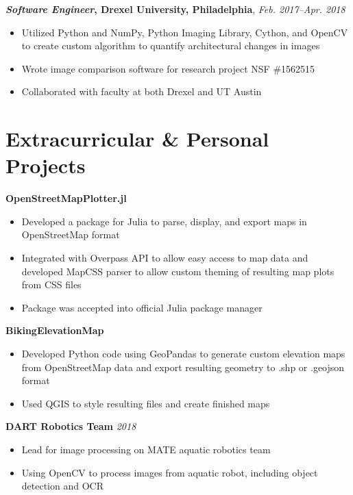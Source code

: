 \documentclass[11pt, a4paper]{article}
\begin{document}
\vspace{1mm}
\textbf{\emph{Software Engineer}, Drexel University, Philadelphia}, \textit{Feb. 2017--Apr. 2018} 
\begin{itemize}
 \item Utilized Python and NumPy, Python Imaging Library, Cython, and OpenCV to create custom algorithm to quantify architectural changes in images
     \item Wrote image comparison software for research project NSF \#1562515
     \item Collaborated with faculty at both Drexel and UT Austin
     \end{itemize}
\vspace{0mm}

\section*{Extracurricular \& Personal Projects}
\textbf{OpenStreetMapPlotter.jl}
\begin{itemize} 
     \item Developed a package for Julia to parse, display, and export maps in OpenStreetMap format
     \item Integrated with Overpass API to allow easy access to map data and developed MapCSS parser to allow custom theming of resulting map plots from CSS files
     \item Package was accepted into official Julia package manager
     \end{itemize}
          \vspace{1mm}
\textbf{BikingElevationMap}
\begin{itemize} 
     \item Developed Python code using GeoPandas to generate custom elevation maps from OpenStreetMap data and export resulting geometry to .shp or .geojson format
     \item Used QGIS to style resulting files and create finished maps
     \end{itemize}
     \vspace{1mm}
\textbf{DART Robotics Team} \textit{2018}
\begin{itemize} 
     \item Lead for image processing on MATE aquatic robotics team
     \item Using OpenCV to process images from aquatic robot, including object detection and OCR
     \end{itemize}
 \vspace{1mm}
  
\end{document}
